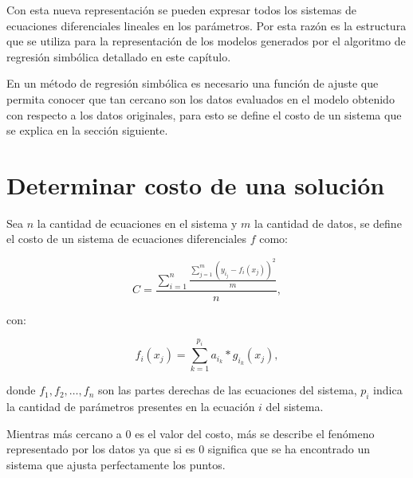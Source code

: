 \begin{center}
\end{center}

Con esta nueva representación se pueden expresar todos los sistemas de ecuaciones diferenciales lineales en los parámetros. Por esta razón es la estructura que se utiliza para la representación de los modelos generados por el algoritmo de regresión simbólica detallado en este capítulo.

En un método de regresión simbólica es necesario una función de ajuste que permita conocer que tan cercano son los datos evaluados en el modelo obtenido con respecto a los datos originales, para esto se define el costo de un sistema que se explica en la sección siguiente.

\section{Determinar costo de una solución}\label{section:solution_cost}

Sea $n$ la cantidad de ecuaciones en el sistema y $m$ la cantidad de datos, se define el costo de un sistema de ecuaciones diferenciales $f$ como:

$$C = \frac{\sum_{i=1}^n\frac{\sum_{j=1}^{m}(y_{i_j} - f_i(x_j))^2}{m}}{n},$$

con:

$$f_i(x_j) = \sum_{k=1}^{p_i} a_{i_k} * g_{i_k}(x_j),$$

donde $f_1, f_2, \dots, f_n$ son las partes derechas de las ecuaciones del sistema, $p_i$ indica la cantidad de parámetros presentes en la ecuación $i$ del sistema.

Mientras más cercano a 0 es el valor del costo, más se describe el fenómeno representado por los datos ya que si es 0 significa que se ha encontrado un sistema que ajusta perfectamente los puntos.

